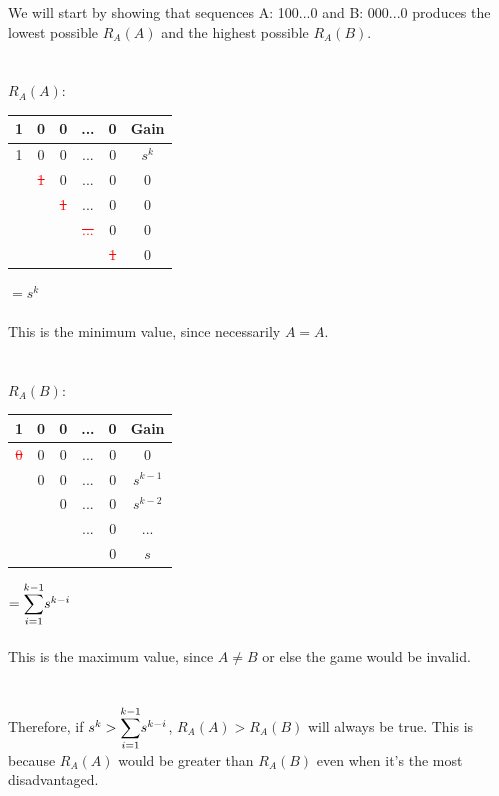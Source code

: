 \documentclass[english,12pt,a4paper,final]{article}
\begin{document}
We will start by showing that sequences A: 100...0 and B: 000...0 produces the lowest possible $R_A(A)$ and the highest possible $R_A(B)$.
\\\\\\
${R_A(A)}$:
\begin{tabular}{|ccccc|c|}
	\hline
	1 & 0 & 0 & ... & 0 & Gain \\
	\hline
	
	\textcolor{OliveGreen}{1} & \textcolor{OliveGreen}{0} & \textcolor{OliveGreen}{0} & \textcolor{OliveGreen}{...} & \textcolor{OliveGreen}{0} & $s^k$\\
	
	& \textcolor{red}{\sout{1}} & 0 & ... & 0 & $0$ \\
	
	&  & \textcolor{red}{\sout{1}} & ... & 0 & $0$ \\
	
	&  &  & \textcolor{red}{\sout{...}} & 0 & $0$ \\
	
	&  &  &  & \textcolor{red}{\sout{1}} & $0$ \\
	\hline
\end{tabular}
$=s^k$
\\\\
This is the minimum value, since necessarily $A=A$.
\\\\\\
${R_A(B)}$:
\begin{tabular}{|ccccc|c|}
	\hline
	1 & 0 & 0 & ... & 0 & Gain \\
	\hline
	
	\textcolor{red}{\sout{0}} & 0 & 0 & ... & 0 & 0\\
	
	& \textcolor{OliveGreen}{0} & \textcolor{OliveGreen}{0} & \textcolor{OliveGreen}{...} & \textcolor{OliveGreen}{0} & $s^{k-1}$\\
	
	&  & \textcolor{OliveGreen}{0} & \textcolor{OliveGreen}{...} & \textcolor{OliveGreen}{0} & $s^{k-2}$ \\
	
	&  &  & \textcolor{OliveGreen}{...} & \textcolor{OliveGreen}{0} & ... \\
	
	&  &  &  & \textcolor{OliveGreen}{0} & $s$ \\
	\hline
\end{tabular}
$=\mathlarger\sum_{i=1}^{k-1}s^{k-i}$
\\\\
This is the maximum value, since $A \neq B$ or else the game would be invalid.
\\\\\\
Therefore, if $s^k > \mathlarger\sum_{i=1}^{k-1}s^{k-i}$, ${R_A(A) > R_A(B)}$ will always be true. This is because $R_A(A)$ would be greater than $R_A(B)$ even when it's the most disadvantaged.
\end{document}
